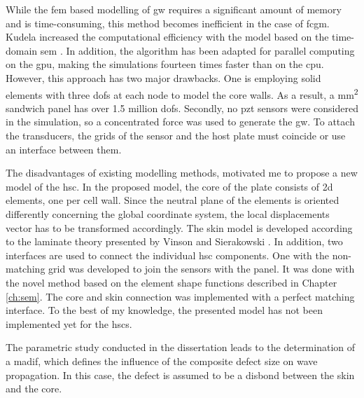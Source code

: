 While the \ac{fem} based modelling of \ac{gw} requires a significant amount of memory and is time-consuming, this method becomes inefficient in the case of \ac{fcgm}.
Kudela increased the computational efficiency with the model based on the time-domain \ac{sem} \cite{kudela2016parallel}.
In addition, the algorithm has been adapted for parallel computing on the \ac{gpu}, making the simulations fourteen times faster than on the \ac{cpu}.
However, this approach has two major drawbacks. One is employing solid elements with three \acp{dof} at each node to model the core walls. As a result, a  \unit{\square\mm} sandwich panel has over 1.5 million \acp{dof}.
Secondly, no \ac{pzt} sensors were considered in the simulation, so a concentrated force was used to generate the \ac{gw}.
To attach the transducers, the grids of the sensor and the host plate must coincide or use an interface between them. 

The disadvantages of existing modelling methods, motivated me to propose a new model of the \ac{hsc}.
In the proposed model, the core of the plate consists of \ac{2d} elements, one per cell wall.
Since the neutral plane of the elements is oriented differently concerning the global coordinate system, the local displacements vector has to be transformed accordingly.
The skin model is developed according to the laminate theory presented by Vinson and Sierakowski \cite{vinson1993behavior}.
In addition, two interfaces are used to connect the individual \ac{hsc} components.
One with the non-matching grid was developed to join the sensors with the panel.
It was done with the novel method based on the element shape functions described in Chapter \ref{ch:sem}.
The core and skin connection was implemented with a perfect matching interface.
To the best of my knowledge, the presented model has not been implemented yet for the \acp{hsc}.

The parametric study conducted in the dissertation leads to the determination of a \ac{madif}, which defines the influence of the composite defect size on wave propagation.
In this case, the defect is assumed to be a disbond between the skin and the core.